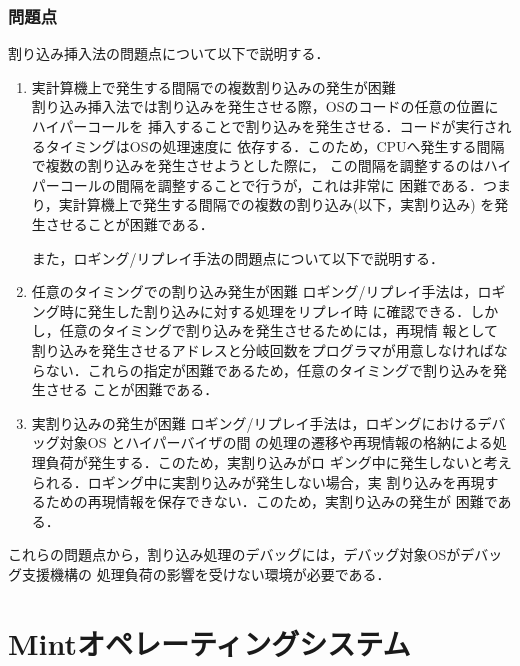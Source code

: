 \documentclass[tanilab-enum]{graduate}
\begin{document}
    \subsection{問題点}
    割り込み挿入法の問題点について以下で説明する．
    \begin{enumerate}
        \item 実計算機上で発生する間隔での複数割り込みの発生が困難\\
            割り込み挿入法では割り込みを発生させる際，OSのコードの任意の位置にハイパーコールを
            挿入することで割り込みを発生させる．コードが実行されるタイミングはOSの処理速度に
            依存する．このため，CPUへ発生する間隔で複数の割り込みを発生させようとした際に，
            この間隔を調整するのはハイパーコールの間隔を調整することで行うが，これは非常に
            困難である．つまり，実計算機上で発生する間隔での複数の割り込み(以下，実割り込み)
            を発生させることが困難である．

    また，ロギング/リプレイ手法の問題点について以下で説明する．
        \item 任意のタイミングでの割り込み発生が困難
            ロギング/リプレイ手法は，ロギング時に発生した割り込みに対する処理をリプレイ時
            に確認できる．しかし，任意のタイミングで割り込みを発生させるためには，再現情
            報として割り込みを発生させるアドレスと分岐回数をプログラマが用意しなければな
            らない．これらの指定が困難であるため，任意のタイミングで割り込みを発生させる
            ことが困難である．
        \item 実割り込みの発生が困難
            ロギング/リプレイ手法は，ロギングにおけるデバッグ対象OS とハイパーバイザの間
            の処理の遷移や再現情報の格納による処理負荷が発生する．このため，実割り込みがロ
            ギング中に発生しないと考えられる．ロギング中に実割り込みが発生しない場合，実
            割り込みを再現するための再現情報を保存できない．このため，実割り込みの発生が
            困難である．
    \end{enumerate}
    これらの問題点から，割り込み処理のデバッグには，デバッグ対象OSがデバッグ支援機構の
    処理負荷の影響を受けない環境が必要である．
\chapter{Mintオペレーティングシステム}\label{chap:Mint}
\end{document}
